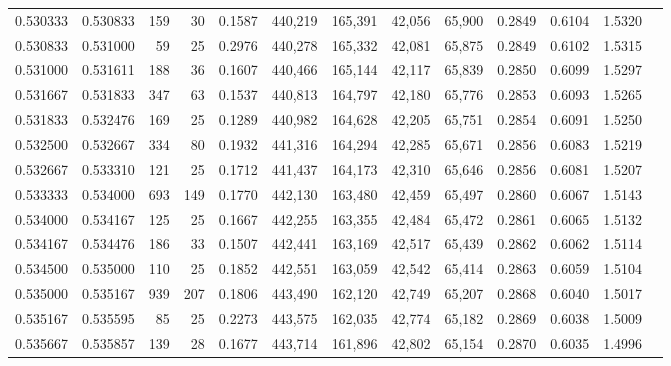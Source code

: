 \begin{tabular}{rrrrrrrrrrrrr}
0.530333 & 0.530833 &   159 &  30 &                                     0.1587 & 440,219 & 165,391 &  42,056 &  65,900 & 0.2849 & 0.6104 & 1.5320 \\
0.530833 & 0.531000 &    59 &  25 &                                     0.2976 & 440,278 & 165,332 &  42,081 &  65,875 & 0.2849 & 0.6102 & 1.5315 \\
0.531000 & 0.531611 &   188 &  36 &                                     0.1607 & 440,466 & 165,144 &  42,117 &  65,839 & 0.2850 & 0.6099 & 1.5297 \\
0.531667 & 0.531833 &   347 &  63 &                                     0.1537 & 440,813 & 164,797 &  42,180 &  65,776 & 0.2853 & 0.6093 & 1.5265 \\
0.531833 & 0.532476 &   169 &  25 &                                     0.1289 & 440,982 & 164,628 &  42,205 &  65,751 & 0.2854 & 0.6091 & 1.5250 \\
0.532500 & 0.532667 &   334 &  80 &                                     0.1932 & 441,316 & 164,294 &  42,285 &  65,671 & 0.2856 & 0.6083 & 1.5219 \\
0.532667 & 0.533310 &   121 &  25 &                                     0.1712 & 441,437 & 164,173 &  42,310 &  65,646 & 0.2856 & 0.6081 & 1.5207 \\
0.533333 & 0.534000 &   693 & 149 &                                     0.1770 & 442,130 & 163,480 &  42,459 &  65,497 & 0.2860 & 0.6067 & 1.5143 \\
0.534000 & 0.534167 &   125 &  25 &                                     0.1667 & 442,255 & 163,355 &  42,484 &  65,472 & 0.2861 & 0.6065 & 1.5132 \\
0.534167 & 0.534476 &   186 &  33 &                                     0.1507 & 442,441 & 163,169 &  42,517 &  65,439 & 0.2862 & 0.6062 & 1.5114 \\
0.534500 & 0.535000 &   110 &  25 &                                     0.1852 & 442,551 & 163,059 &  42,542 &  65,414 & 0.2863 & 0.6059 & 1.5104 \\
0.535000 & 0.535167 &   939 & 207 &                                     0.1806 & 443,490 & 162,120 &  42,749 &  65,207 & 0.2868 & 0.6040 & 1.5017 \\
0.535167 & 0.535595 &    85 &  25 &                                     0.2273 & 443,575 & 162,035 &  42,774 &  65,182 & 0.2869 & 0.6038 & 1.5009 \\
0.535667 & 0.535857 &   139 &  28 &                                     0.1677 & 443,714 & 161,896 &  42,802 &  65,154 & 0.2870 & 0.6035 & 1.4996 \\

\end{tabular}
